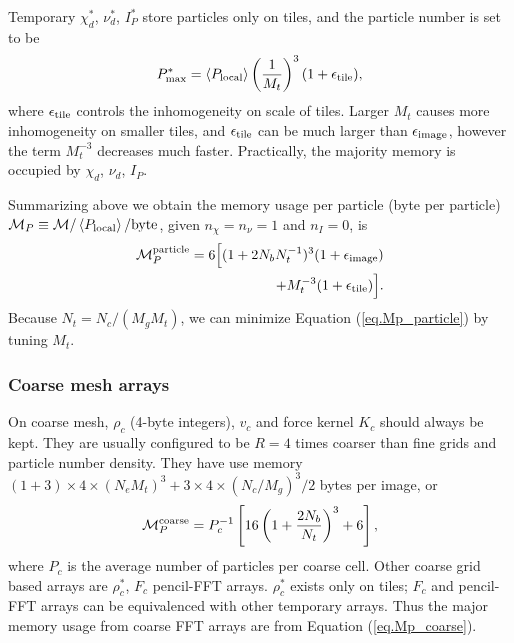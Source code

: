\documentclass[10pt,twocolumn,preprint]{emulateapj}
\begin{document}
Temporary $\chi_d^*$, $\nu_d^*$, $I_P^*$ store particles only on tiles, and the particle number is set to be
\begin{equation}\label{eq.nptile}
	P_{\rm max}^*=\left\langle P_{\rm local} \right\rangle \left( \frac{1}{M_t} \right)^3(1+\epsilon_{\rm tile}),
\end{equation}
where $\epsilon_{\rm tile}$ controls the inhomogeneity on scale of tiles. Larger $M_t$ causes more inhomogeneity on smaller tiles, and $\epsilon_{\rm tile}$ can be much larger than $\epsilon_{\rm image}$, however the term $M_t^{-3}$ decreases much faster. Practically, the majority memory is occupied by $\chi_d$, $\nu_d$, $I_P$.

Summarizing above we obtain the memory usage per particle (byte per particle) ${\mathcal M}_P \equiv {\mathcal M} / \left\langle P_{\rm local} \right\rangle/{\rm byte}$, given $n_\chi=n_\nu=1$ and $n_I=0$, is
\begin{eqnarray}\label{eq.Mp_particle}
\nonumber\mathcal{M}_P^{\rm particle}=6\Big [ (1+2N_b N_t^{-1})^3(1+\epsilon_{\rm image} )\\
	+M_t^{-3}(1+\epsilon_{\rm tile})\Big ].
\end{eqnarray}
Because $N_t=N_c/(M_g M_t)$, we can minimize Equation (\ref{eq.Mp_particle}) by tuning $M_t$.

\subsubsection{Coarse mesh arrays}
On coarse mesh, $\rho_c$ (4-byte integers), $v_c$ and force kernel $K_c$ should always be kept. They are usually configured to be $R=4$ times coarser than fine grids and particle number density. They have use memory $(1+3)\times 4\times(N_e M_t)^3+3\times 4\times(N_c/M_g)^3/2$ bytes per image, or
\begin{equation}\label{eq.Mp_coarse}
	\mathcal{M}_P^{\rm coarse}=P_c^{-1} \left [ 16\left( 1+\frac{2N_b}{N_t} \right)^3+6 \right ],
\end{equation}
where $P_c$ is the average number of particles per coarse cell. Other coarse grid based arrays are $\rho_c^*$, $F_c$ pencil-FFT arrays. $\rho_c^*$ exists only on tiles; $F_c$ and pencil-FFT arrays can be equivalenced with other temporary arrays. Thus the major memory usage from coarse FFT arrays are from Equation (\ref{eq.Mp_coarse}).
\end{document}
